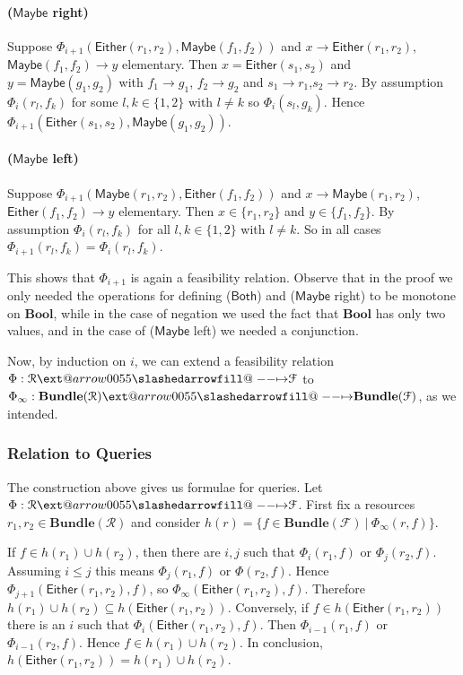 \documentclass[12pt]{article}
\makeatletter
\theoremstyle{definition}
\theoremstyle{plain}
\theoremstyle{plain}
\theoremstyle{plain}
\theoremstyle{plain}
\theoremstyle{remark}
\theoremstyle{remark}
\newcommand{\mc}[1]{\mathcal{#1}}
\newcommand{\maybe}{\mathsf{Maybe}}
\newcommand{\either}{\mathsf{Either}}
\newcommand{\both}{\mathsf{Both}}
\newcommand{\sub}{\subseteq}
\def\slashedarrowfill@#1#2#3#4#5{%
	$\m@th\thickmuskip0mu\medmuskip\thickmuskip\thinmuskip\thickmuskip
	\relax#5#1\mkern-7mu%
	\cleaders\hbox{$#5\mkern-2mu#2\mkern-2mu$}\hfill
	\mathclap{#3}\mathclap{#2}%
	\cleaders\hbox{$#5\mkern-2mu#2\mkern-2mu$}\hfill
	\mkern-7mu#4$%
}
\def\rightslashedarrowfill@{%
	\slashedarrowfill@\relbar\relbar\mapstochar\rightarrow}
\newcommand\xslashedrightarrow[2][]{%
	\ext@arrow 0055{\rightslashedarrowfill@}{#1}{#2}}
\makeatother
\begin{document}
\paragraph{($\maybe$ right)} Suppose $\Phi_{i+1}(\either(r_1,r_2),\maybe(f_1,f_2))$ and $x \rightarrow \either(r_1,r_2)$, $\maybe(f_1,f_2) \rightarrow y$ elementary. Then $x = \either(s_1,s_2)$ and $y = \maybe(g_1,g_2)$ with $f_1 \rightarrow g_1$, $f_2 \rightarrow g_2$ and $s_1 \rightarrow r_1$,$s_2 \rightarrow r_2$. By assumption $\Phi_i(r_l,f_k)$ for some $l,k \in \{1,2\}$ with $l \neq k$ so $\Phi_i(s_l,g_k)$. Hence $\Phi_{i+1}(\either(s_1,s_2),\maybe(g_1,g_2))$.

\paragraph{($\maybe$ left)} Suppose $\Phi_{i+1}(\maybe(r_1,r_2),\either(f_1,f_2))$ and $x \rightarrow \maybe(r_1,r_2)$, $\either(f_1,f_2) \rightarrow y$ elementary. Then $x \in \{r_1,r_2\}$ and $y \in \{f_1,f_2\}$. By assumption $\Phi_i(r_l,f_k)$ for all $l,k \in \{1,2\}$ with $l \neq k$. So in all cases $\Phi_{i+1}(r_l,f_k) = \Phi_{i}(r_l,f_k)$.

This shows that $\Phi_{i+1}$ is again a feasibility relation. Observe that in the proof we only needed the operations for defining ($\both$) and ($\maybe$ right) to be monotone on $\mathbf{Bool}$, while in the case of negation we used the fact that $\mathbf{Bool}$ has only two values, and in the case of ($\maybe$ left) we needed a conjunction.

Now, by induction on $i$, we can extend a feasibility relation $\Phi: \mc{R} \xslashedrightarrow{} \mc{F}$ to $\Phi_\infty: \mathbf{Bundle}(\mc{R}) \xslashedrightarrow{} \mathbf{Bundle}(\mc{F})$, as we intended.

\subsubsection{Relation to Queries}
The construction above gives us formulae for queries. Let  $\Phi: \mc{R} \xslashedrightarrow{} \mc{F}$. First fix a resources $r_1,r_2 \in \mathbf{Bundle}(\mc{R})$ and consider $h(r) = \{f \in \mathbf{Bundle}(\mc{F}) \: | \: \Phi_\infty(r,f)\}$. 

If $f \in h(r_1) \cup h(r_2)$, then there are $i,j$ such that $\Phi_i(r_1,f)$ or $\Phi_j(r_2,f)$. Assuming $i \leq j$ this means $\Phi_j(r_1,f)$ or $\Phi(r_2,f)$. Hence $\Phi_{j+1}(\either(r_1,r_2),f)$, so $\Phi_\infty(\either(r_1,r_2),f)$. Therefore $h(r_1) \cup h(r_2) \sub h(\either(r_1,r_2))$. Conversely, if $f \in h(\either(r_1,r_2))$ there is an $i$ such that $\Phi_i(\either(r_1,r_2),f)$. Then $\Phi_{i-1}(r_1,f)$ or $\Phi_{i-1}(r_2,f)$. Hence $f \in h(r_1) \cup h(r_2)$. In conclusion, $ h(\either(r_1,r_2)) = h(r_1) \cup h(r_2)$.
\end{document}

